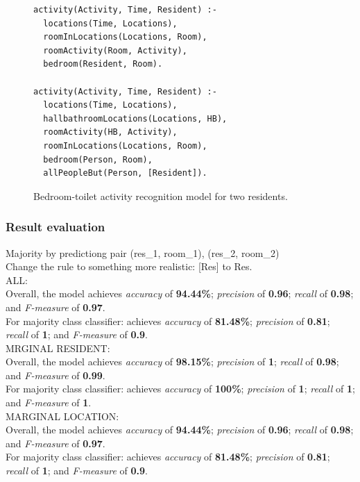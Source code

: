 \documentclass[10pt, a4paper, pdflatex, leqno, twoside, openright]{report}
\begin{document}
\begin{figure}[htb]
  \begin{verbatim}
activity(Activity, Time, Resident) :-
  locations(Time, Locations),
  roomInLocations(Locations, Room),
  roomActivity(Room, Activity),
  bedroom(Resident, Room).

activity(Activity, Time, Resident) :-
  locations(Time, Locations),
  hallbathroomLocations(Locations, HB),
  roomActivity(HB, Activity),
  roomInLocations(Locations, Room),
  bedroom(Person, Room),
  allPeopleBut(Person, [Resident]).
  \end{verbatim}
  \caption{Bedroom-toilet activity recognition model for two residents.\label{lst:BTtwo}}
\end{figure}

      \subsubsection{Result evaluation}
Majority by predictiong pair (res\_1, room\_1), (res\_2, room\_2)\\
Change the rule to something more realistic: [Res] to Res.\\

ALL:\\
Overall, the model achieves \emph{accuracy} of \textbf{94.44\%}; \emph{precision} of \textbf{0.96}; \emph{recall} of \textbf{0.98}; and \emph{F-measure} of \textbf{0.97}.\\
For majority class classifier: achieves \emph{accuracy} of \textbf{81.48\%}; \emph{precision} of \textbf{0.81}; \emph{recall} of \textbf{1}; and \emph{F-measure} of \textbf{0.9}.\\

MRGINAL RESIDENT:\\
Overall, the model achieves \emph{accuracy} of \textbf{98.15\%}; \emph{precision} of \textbf{1}; \emph{recall} of \textbf{0.98}; and \emph{F-measure} of \textbf{0.99}.\\
For majority class classifier: achieves \emph{accuracy} of \textbf{100\%}; \emph{precision} of \textbf{1}; \emph{recall} of \textbf{1}; and \emph{F-measure} of \textbf{1}.\\

MARGINAL LOCATION:\\
Overall, the model achieves \emph{accuracy} of \textbf{94.44\%}; \emph{precision} of \textbf{0.96}; \emph{recall} of \textbf{0.98}; and \emph{F-measure} of \textbf{0.97}.\\
For majority class classifier: achieves \emph{accuracy} of \textbf{81.48\%}; \emph{precision} of \textbf{0.81}; \emph{recall} of \textbf{1}; and \emph{F-measure} of \textbf{0.9}.
\end{document}
